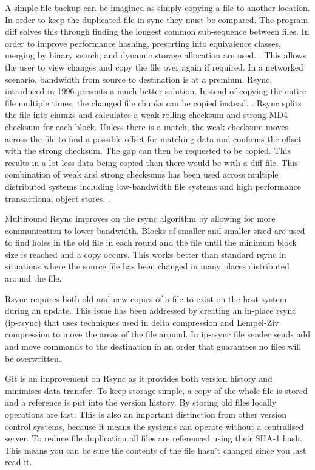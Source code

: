 \documentclass[a4paper,11pt]{article}
\begin{document}
A simple file backup can be imagined as simply copying a file to another location. In order to keep the duplicated file in sync they must be compared. The program diff solves this through finding the longest common sub-sequence between files. In order to improve performance hashing, presorting into equivalence classes, merging by binary search, and dynamic storage allocation are used. \citep{hunt1976algorithm}. This allows the user to view changes and copy the file over again if required.
In a networked scenario, bandwidth from source to destination is at a premium. Rsync, introduced in 1996 presents a much better solution. Instead of copying the entire file multiple times, the changed file chunks can be copied instead. \citep{tridgell1996rsync}. Rsync splits the file into chunks and calculates a weak rolling checksum and strong MD4 checksum for each block. Unless there is a match, the weak checksum moves across the file to find a possible offset for matching data and confirms the offset with the strong checksum. The gap can then be requested to be copied. This results in a lot less data being copied than there would be with a diff file. \citep{tridgell1996rsync} This combination of weak and strong checksums has been used across multiple distributed systems including low-bandwidth file systems \citep{muthitacharoen2001low} and high performance transactional object stores. \citep{stephen2000platypus}.

Multiround Rsync improves on the rsync algorithm by allowing for more communication to lower bandwidth. Blocks of smaller and smaller sized are used to find holes in the old file in each round and the file until the minimum block size is reached and a copy occurs. \citep{multiroundrsync} This works better than standard rsync in situations where the source file has been changed in many places distributed around the file.

Rsync requires both old and new copies of a file to exist on the host system during an update. This issue has been addressed by creating an in-place rsync (ip-rsync) that uses techniques used in delta compression and Lempel-Ziv compression to move the areas of the file around. In ip-rsync file sender sends add and move commands to the destination in an order that guarantees no files will be overwritten. \citep{rasch2003place}

Git is an improvement on Rsync as it provides both version history and minimises data transfer. To keep storage simple, a copy of the whole file is stored and a reference is put into the version history. By storing old files locally operations are fast. This is also an important distinction from other version control systems, because it means the systems can operate without a centralised server. To reduce file duplication all files are referenced using their SHA-1 hash. This means you can be sure the contents of the file hasn’t changed since you last read it.
\end{document}
